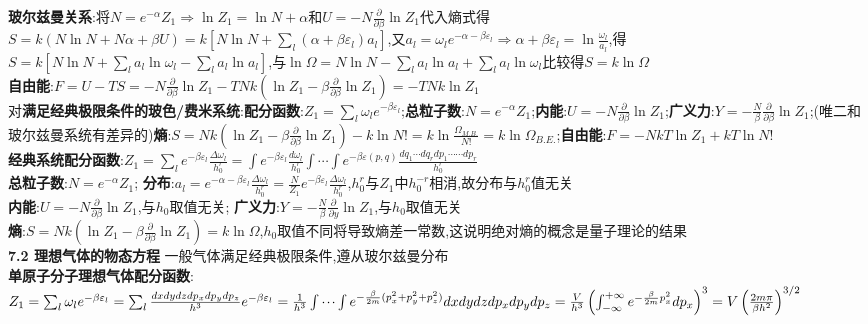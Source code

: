 \documentclass[10pt,a4paper]{article}
\begin{document}
\begin{multicols}{2}
\textbf{玻尔兹曼关系}:将$N=e^{-\alpha}Z_1\Rightarrow\ln Z_1=\ln N+\alpha$和$U=-N\frac{\partial}{\partial\beta}\ln Z_1$代入熵式得$S=k(N\ln N+N\alpha+\beta U)=k\left[N\ln N+\sum_l(\alpha+\beta\varepsilon_l)a_l\right]$,又$a_l=\omega_le^{-\alpha-\beta\varepsilon_l}\Rightarrow\alpha+\beta\varepsilon_l=\ln\frac{\omega_l}{a_l}$,得$S=k\left[N\ln N+\sum_la_l\ln\omega_l-\sum_la_l\ln a_l\right]$,与$\ln\Omega=N\ln N-\sum_la_l\ln a_l+\sum_la_l\ln\omega_l$比较得$S=k\ln\Omega$\\
\textbf{自由能}:$F=U-TS=-N\frac{\partial}{\partial\beta}\ln Z_1-TNk\left(\ln Z_1-\beta\frac{\partial}{\partial\beta}\ln Z_1\right)=-TNk\ln Z_1$\\
对\textbf{满足经典极限条件的玻色/费米系统}:\textbf{配分函数}:$Z_1=\sum_l\omega_le^{-\beta\varepsilon_l}$;\textbf{总粒子数}:$N=e^{-\alpha}Z_1$;\textbf{内能}:$U=-N\frac{\partial}{\partial\beta}\ln Z_1$;\textbf{广义力}:$Y=-\frac{N}{\beta}\frac{\partial}{\partial\beta}\ln Z_1$;(唯二和玻尔兹曼系统有差异的)\textbf{熵}:$S=Nk\left(\ln Z_1-\beta\frac{\partial}{\partial\beta}\ln Z_1\right)-k\ln N!=k\ln\frac{\Omega_{M.B.}}{N!}=k\ln\Omega_{B.E.}$;\textbf{自由能}:$F=-NkT\ln Z_1+kT\ln N!$\\
\textbf{经典系统配分函数}:$Z_1=\sum_le^{-\beta\varepsilon_l}\frac{\Delta\omega_l}{h_0^r}=\int e^{-\beta\varepsilon_l}\frac{d\omega_l}{h_0^r}\int\cdots\int e^{-\beta\varepsilon(p,q)}\frac{dq_1\cdots dq_rdp_1\cdots\cdots dp_r}{h_0^r}$\\
\textbf{总粒子数}:$N=e^{-\alpha}Z_1$;
\textbf{分布}:$a_l=e^{-\alpha-\beta\varepsilon_l}\frac{\Delta\omega_l}{h_0^r}=\frac{N}{Z_1}e^{-\beta\varepsilon_l}\frac{\Delta\omega_l}{h_0^r}$,$h_0^r$与$Z_1$中$h_0^{-r}$相消,故分布与$h_0^r$值无关\\
\textbf{内能}:$U=-N\frac{\partial}{\partial\beta}\ln Z_1$,与$h_0$取值无关;\quad
\textbf{广义力}:$Y=-\frac{N}{\beta}\frac{\partial}{\partial y}\ln Z_1$,与$h_0$取值无关\\
\textbf{熵}:$S=Nk\left(\ln Z_1-\beta\frac{\partial}{\partial\beta}\ln Z_1\right)=k\ln\Omega$,$h_0$取值不同将导致熵差一常数,这说明绝对熵的概念是量子理论的结果\\
\textbf{7.2 理想气体的物态方程}
一般气体满足经典极限条件,遵从玻尔兹曼分布\\
\textbf{单原子分子理想气体配分函数}:$Z_1=\sum_l\omega_le^{-\beta\varepsilon_l}=\sum_l\frac{dxdydzdp_xdp_ydp_z}{h^3}e^{-\beta\varepsilon_l}=\frac{1}{h^3}\idotsint\\e^{-\frac{\beta}{2m}(p_x^2+p_y^2+p_z^2)}dxdydzdp_xdp_ydp_z=\frac{V}{h^3}\left(\int_{-\infty}^{+\infty}e^{-\frac{\beta}{2m}p_x^2}dp_x\right)^3=V\left(\frac{2m\pi}{\beta h^2}\right)^{3/2}$\\

\end{multicols}
\end{document}
